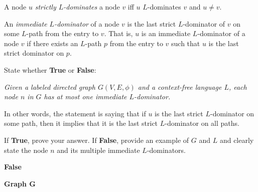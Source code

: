 \documentclass[12pt]{article}
\begin{document}
\begin{enumerate}
      A node $u$ \emph{strictly $L$-dominates} a node $v$ iff $u$ $L$-dominates $v$ 
      and $u \neq v$. 

      An \emph{immediate $L$-dominator} of a node $v$ is the last strict
      $L$-dominator of $v$ on some $L$-path from the entry to $v$. That is, $u$
      is an immediate $L$-dominator of a node $v$ if there exists an $L$-path
      $p$ from the entry to $v$ such that $u$ is the last strict dominator on
      $p$.

      State whether \textbf{True} or \textbf{False}: 
    
      \emph{Given a labeled directed graph $G(V,E, \phi)$ and a context-free
      language $L$, each node $n$ in $G$ has at most one immediate $L$-dominator.}

      In other words, the statement is saying that if $u$ is the last strict
      $L$-dominator on some path, then it implies that it is the last strict
      $L$-dominator on all paths. 
    
      If \textbf{True}, prove your answer. If \textbf{False}, provide an example
      of $G$ and $L$ and clearly state the node $n$ and its multiple immediate
      $L$-dominators.
      \begin{mdframed}
      \textbf{False} %

      \textbf{Graph G}

\end{mdframed}
\end{enumerate}
\end{document}
